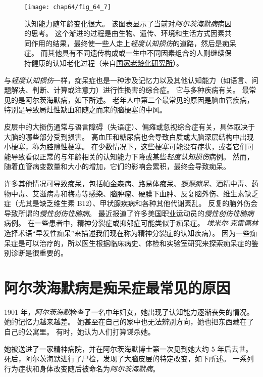 \begin{figure}[htbp]
	\centering
	\texttt{[image: chap64/fig\_64\_7]}
	\caption{认知能力随年龄变化很大。
		该图表显示了当前对\textit{阿尔茨海默病}病因的思考。
		这个渐进的过程是由生物、遗传、环境和生活方式因素共同作用的结果，最终使一些人走上\textit{轻度认知损伤}的道路，然后是痴呆症。
		而其他具有不同遗传构成或一生中不同因素组合的人则继续保持健康的认知老化过程（来自\href{http://www.nia.nih.gov/alzheimers/publication/part-2-what-happens-brain-ad/changing-brain-ad}{国家老龄化研究所}）。}
	\label{fig:64_7}
\end{figure}


与\textit{轻度认知损伤}一样，痴呆症也是一种涉及记忆力以及其他认知能力（如语言、问题解决、判断、计算或注意力）进行性损害的综合症。
它与多种疾病有关。
最常见的是阿尔茨海默病，如下所述。
老年人中第二个最常见的原因是脑血管疾病，特别是导致局灶性缺血和随之而来的脑梗塞的中风。


皮层中的大损伤通常与语言障碍（失语症）、偏瘫或忽视综合症有关，具体取决于大脑的哪些部分受到损害。
高血压和糖尿病也会导致白质或大脑深层结构中出现小梗塞，称为腔隙性梗塞。
在少数情况下，这些梗塞可能没有症状，或者它们可能导致看似正常的与年龄相关的认知能力下降或某些\textit{轻度认知损伤}病例。
然而，随着血管病变数量和大小的增加，它们的影响会累积，最终会导致痴呆。


许多其他情况可导致痴呆，包括帕金森病、路易体痴呆、\textit{额颞痴呆}、酒精中毒、药物中毒、艾滋病毒和梅毒等感染、脑肿瘤、硬膜下血肿、反复脑外伤、维生素缺乏症（尤其是缺乏维生素 B12）、甲状腺疾病和各种其他代谢紊乱。
反复的脑外伤会导致所谓的\textit{慢性创伤性脑病}。
最近报道了许多美国职业运动员的\textit{慢性创伤性脑病}病例。
在一些患者中，精神分裂症或抑郁症可能类似于痴呆症。
\textit{埃米尔$\cdot$克雷佩林}选择术语“早发性痴呆”来描述我们现在称为精神分裂症的认知疾病）。
因为一些痴呆症是可以治疗的，所以医生根据临床病史、体检和实验室研究来探索痴呆症的鉴别诊断是很重要的。



\section{阿尔茨海默病是痴呆症最常见的原因}

1901 年，\textit{阿尔茨海默}检查了一名中年妇女，她出现了认知能力逐渐丧失的情况。
她的记忆力越来越差。
她甚至在自己的家中也无法辨别方向，她也把东西藏在了自己的公寓里。
有时，她认为人们打算谋杀她。


她被送进了一家精神病院，并在阿尔茨海默博士第一次见到她大约 5 年后去世。
死后，阿尔茨海默进行了尸检，发现了大脑皮层的特定改变，如下所述。
一系列行为症状和身体改变随后被命名为\textit{阿尔茨海默病}。


